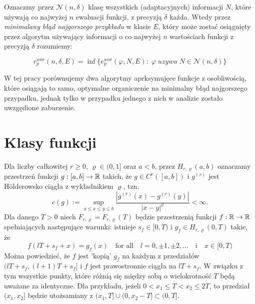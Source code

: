 \documentclass[oik, pdftex, robocza, man]{mgrwms}
\begin{document}
    Oznaczmy przez $\mathcal{N}(n, \delta)$ klasę wszystkich (adaptacyjnych) informacji $N$, które używają co najwyżej $n$ ewaluacji funkcji, z precyzją $\delta$ każda. Wtedy przez \textit{minimalany błąd najgorszego przykładu} w klasie $E$, który może zostać osiągnięty przez algorytm używający informacji o co najwyżej $n$ wartościach funkcji z precyzją $\delta$ rozumiemy:

    \begin{equation*}
        r^{wor}_{p}(n, \delta, E) = \inf\{ e^{wor}_{p}(\varphi, N, E) : \; \varphi \; uzywa \; N \in \mathcal{N}(n, \delta) \}
    \end{equation*}

    W tej pracy porównujemy dwa algorytmy aprksymujęce funkcje z osobliwością, które osiągają to samo, optymalne organiczenie na minimalny błąd najgorszego przypadku, jednak tylko w przypadku jednego z nich w analizie zostało uwzgędione zaburzenie.

\section{Klasy funkcji}

    Dla liczby całkowitej $ r \geq 0$, $\varrho \in (0,1]$ oraz $a < b$, przez $H_{r, \varrho}(a,b)$ oznaczamy przestrzeń funkcji $g: [a,b] \rightarrow \mathbb{R}$ takich, że $g \in C^r([a, b])$ i $g^{(r)}$ jest Hölderowsko ciągła z wykładnikiem $\varrho$, tzn.
    \begin{equation*}
        c(g) := \sup_{a \leq x \leq y \leq b} \frac{|g^{(r)}(x) - g^{(r)}(y)|}{|x-y|^{\varrho}} < \infty.
    \end{equation*}
    Dla danego $T > 0$ niech $F_{r, \varrho} = F_{r, \varrho}(T)$ będzie przestrzenią funkcji $f: \mathbb{R} \rightarrow \mathbb{R}$ spełniających następujące warunki: istnieje $s_f \in [0, T)$ i $g_f \in H_{r, \varrho}(0,T)$ takie, że
    \begin{equation*}
        f(lT + s_f + x) = g_f(x) \quad \text{for all} \quad l = 0, \pm 1, \pm 2, \ldots \quad \text{i} \quad x \in [0, T)
    \end{equation*}
    Można powiedzieć, że $f$ jest 'kopią' $g_f$ na każdym z przedziałów $(lT + s_f, (l + 1)T + s_f]$ i $f$ jest prawostronnie ciągła na $lT + s_f$. W związku z tym wszystkie punkty, które różnią się między sobą o wielokrotność $T$ będą uważane za identyczne. Dla przykładu, jeżeli $0 < x_1 \leq T < x_2 \leq 2T$, to przedział $(x_1, x_2]$ będzie utożsamiany z $(x_1,T] \cup (0, x_2 - T] \subset (0, T]$.
\end{document}

